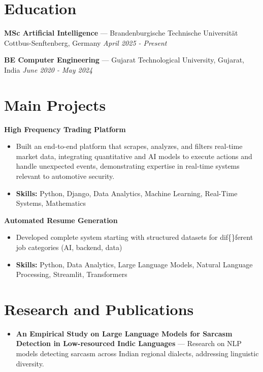 \documentclass[a4paper,10pt]{article}
\begin{document}
\section*{Education}
\textbf{MSc Artificial Intelligence} — Brandenburgische Technische Universität Cottbus-Senftenberg, Germany \hfill \textit{April 2025 - Present}\par
\vspace{1.5pt}
\textbf{BE Computer Engineering} — Gujarat Technological University, Gujarat, India \hfill \textit{June 2020 - May 2024}\par

\section*{Main Projects}
\textbf{High Frequency Trading Platform}\par
\vspace{1pt}
\begin{itemize}
  \item Built an end-to-end platform that scrapes, analyzes, and filters real-time market data, integrating quantitative and AI models to execute actions and handle unexpected events, demonstrating expertise in real-time systems relevant to automotive security.
  \item \textbf{Skills:} Python, Django, Data Analytics, Machine Learning, Real-Time Systems, Mathematics
\end{itemize}
\vspace{3pt}
\textbf{Automated Resume Generation}\par
\vspace{1pt}
\begin{itemize}
  \item Developed complete system starting with structured datasets for dif\{\}ferent job categories (AI, backend, data)
  \item \textbf{Skills:} Python, Data Analytics, Large Language Models, Natural Language Processing, Streamlit, Transformers
\end{itemize}

\section*{Research and Publications}
\begin{itemize}
\item \textbf{An Empirical Study on Large Language Models for Sarcasm Detection in Low-resourced Indic Languages} — Research on NLP models detecting sarcasm across Indian regional dialects, addressing linguistic diversity.
\end{itemize}
\end{document}
